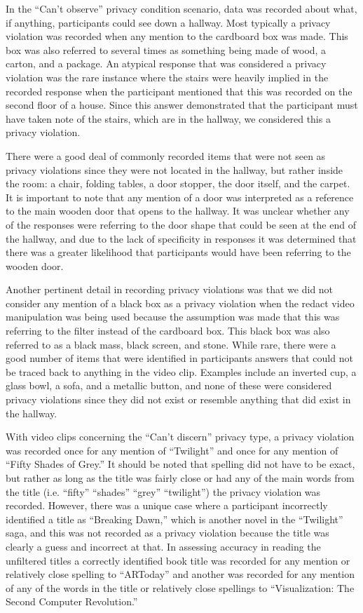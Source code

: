 \documentclass{acm_proc_article-sp}
\begin{document}
In the ``Can't observe'' privacy condition scenario, data was recorded about what, if anything, participants could see down a hallway. Most typically a privacy violation was recorded when any mention to the cardboard box was made. This box was also referred to several times as something being made of wood, a carton, and a package. An atypical response that was considered a privacy violation was the rare instance where the stairs were heavily implied in the recorded response when the participant mentioned that this was recorded on the second floor of a house. Since this answer demonstrated that the participant must have taken note of the stairs, which are in the hallway, we considered this a privacy violation. 

There were a good deal of commonly recorded items that were not seen as privacy violations since they were not located in the hallway, but rather inside the room: a chair, folding tables, a door stopper, the door itself, and the carpet.  It is important to note that any mention of a door was interpreted as a reference to the main wooden door that opens to the hallway. It was unclear whether any of the responses were referring to the door shape that could be seen at the end of the hallway, and due to the lack of specificity in responses it was determined that there was a greater likelihood that participants would have been referring to the wooden door.

 Another pertinent detail in recording privacy violations was that we did not consider any mention of a black box as a privacy violation when the redact video manipulation was being used because the assumption was made that this was referring to the filter instead of the cardboard box. This black box was also referred to as a black mass, black screen, and stone. While rare, there were a good number of items that were identified in participants answers that could not be traced back to anything in the video clip. Examples include an inverted cup, a glass bowl, a sofa, and a metallic button, and none of these were considered privacy violations since they did not exist or resemble anything that did exist in the hallway. 

With video clips concerning the ``Can't discern'' privacy type, a privacy violation was recorded once for any mention of ``Twilight'' and once for any mention of ``Fifty Shades of Grey.'' It should be noted that spelling did not have to be exact, but rather as long as the title was fairly close or had any of the main words from the title (i.e. ``fifty'' ``shades'' ``grey'' ``twilight'') the privacy violation was recorded. However, there was a unique case where a participant incorrectly identified a title as ``Breaking Dawn,'' which is another novel in the ``Twilight'' saga, and this was not recorded as a privacy violation because the title was clearly a guess and incorrect at that. In assessing accuracy in reading the unfiltered titles a correctly identified book title was recorded for any mention or relatively close spelling to ``ARToday'' and another was recorded for any mention of any of the words in the title or relatively close spellings to ``Visualization: The Second Computer Revolution.''



\balancecolumns
\end{document}
